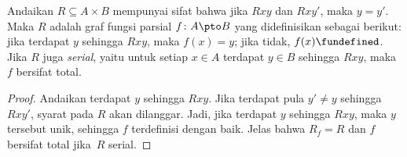 \documentclass[../../../include/open-logic-section]{subfiles}
\begin{document}
\begin{prop}
Andaikan $R \subseteq A \times B$ mempunyai sifat bahwa jika $Rxy$ dan
$Rxy'$, maka $y = y'$. Maka $R$ adalah graf fungsi parsial $f\colon A \pto B$
yang didefinisikan sebagai berikut: jika terdapat $y$ sehingga $Rxy$, maka
$f(x) = y$; jika tidak, $f(x) \fundefined$. Jika $R$ juga \emph{serial}, yaitu
untuk setiap $x \in A$ terdapat $y \in B$ sehingga $Rxy$, maka $f$ bersifat
total.
\end{prop}

\begin{proof}
Andaikan terdapat $y$ sehingga $Rxy$. Jika terdapat pula $y' \neq y$ sehingga
$Rxy'$, syarat pada $R$ akan dilanggar. Jadi, jika terdapat $y$ sehingga
$Rxy$, maka $y$ tersebut unik, sehingga $f$ terdefinisi dengan baik. Jelas
bahwa $R_f = R$ dan $f$ bersifat total jika~$R$ serial.
\end{proof}
\end{document}
